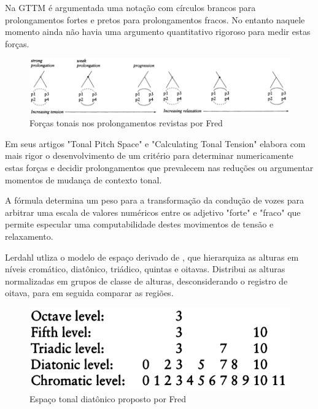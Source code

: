 \documentclass[
	12pt,				%
	openright,			%
	twoside,			%
	a4paper,			%
	english,			%
	french,				%
	spanish,			%
	brazil				%
	]{abntex2}
\begin{document}
\pagebreak
Na GTTM\cite[pg. 182]{lerdahl1983generative} é argumentada uma notação com círculos brancos para prolongamentos fortes e pretos para prolongamentos fracos. No entanto naquele momento ainda não havia uma argumento quantitativo rigoroso para medir estas forças.

\begin{figure}[!h]
	\caption{\label{fig_grafico}Forças tonais nos prolongamentos revistas por Fred  }
	\begin{center}
	    \includegraphics[scale=0.5]{lerdahl/prolongation_calculating.png}
	\end{center}
\end{figure}


Em seus artigos "Tonal Pitch Space"\cite{lerdahl1988tps} e "Calculating Tonal Tension"\cite{lerdahl1996calculating} elabora com mais rigor o desenvolvimento de um critério para determinar numericamente estas forças e decidir prolongamentos que prevalecem nas reduções ou argumentar momentos de mudança de contexto tonal. 


A fórmula determina um peso para a transformação da condução de vozes para arbitrar uma escala de valores numéricos entre os adjetivo "forte" e "fraco" que permite especular uma computabilidade destes movimentos de tensão e relaxamento.

Lerdahl utliza o modelo de espaço derivado de  , que hierarquiza as alturas em níveis cromático, diatônico, triádico, quintas e oitavas. Distribui as alturas normalizadas em grupos de classe de alturas, desconsiderando o registro de oitava, para em seguida comparar as regiões.

\begin{figure}[!h]
	\caption{\label{fig_grafico}Espaço tonal diatônico proposto por Fred  }
	\begin{center}
	    \includegraphics[scale=0.4]{lerdahl/diatonic_pitchspace_p322.png}
	\end{center}
\end{figure}
\end{document}
